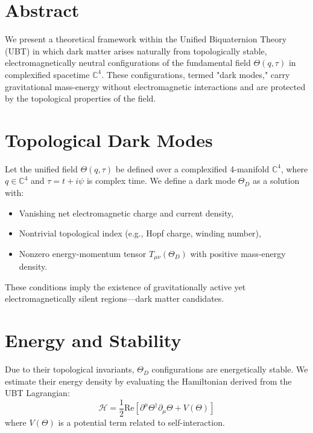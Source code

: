 \maketitle

\section*{Abstract}
We present a theoretical framework within the Unified Biquaternion Theory (UBT) in which dark matter arises naturally from topologically stable, electromagnetically neutral configurations of the fundamental field \( \Theta(q, \tau) \) in complexified spacetime \( \mathbb{C}^4 \). These configurations, termed "dark modes," carry gravitational mass-energy without electromagnetic interactions and are protected by the topological properties of the field.

\section{Topological Dark Modes}
Let the unified field \( \Theta(q, \tau) \) be defined over a complexified 4-manifold \( \mathbb{C}^4 \), where \( q \in \mathbb{C}^4 \) and \( \tau = t + i\psi \) is complex time. We define a dark mode \( \Theta_D \) as a solution with:

\begin{itemize}
  \item Vanishing net electromagnetic charge and current density,
  \item Nontrivial topological index (e.g., Hopf charge, winding number),
  \item Nonzero energy-momentum tensor \( T_{\mu\nu}(\Theta_D) \) with positive mass-energy density.
\end{itemize}

These conditions imply the existence of gravitationally active yet electromagnetically silent regions—dark matter candidates.

\section{Energy and Stability}
Due to their topological invariants, \( \Theta_D \) configurations are energetically stable. We estimate their energy density by evaluating the Hamiltonian derived from the UBT Lagrangian:
\begin{equation}
\mathcal{H} = \frac{1}{2} \text{Re} \left[ \partial^\mu \Theta^\dagger \partial_\mu \Theta + V(\Theta) \right]
\end{equation}
where \( V(\Theta) \) is a potential term related to self-interaction.

